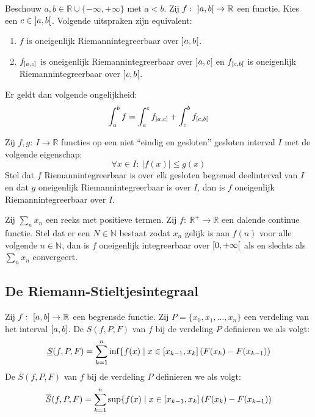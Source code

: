 \documentclass[main.tex]{subfiles}
\begin{document}
\begin{bpr}
  Beschouw $a,b\in \mathbb{R} \cup \{-\infty,+\infty\}$ met $a<b$.
  Zij $f:\ \interval[open]{a}{b} \rightarrow \mathbb{R}$ een functie.
  Kies een $c\in \interval[open]{a}{b}$.
  Volgende uitspraken zijn equivalent:
  \begin{enumerate}
  \item $f$ is oneigenlijk Riemannintegreerbaar over $\interval[open]{a}{b}$.
  \item $f_{\interval[open left]{a}{c}}$ is oneigenlijk Riemannintegreerbaar over $\interval[open]{a}{c}$ en $f_{\interval[open right]{c}{b}}$ is oneigenlijk Riemannintegreerbaar over $\interval[open]{c}{b}$.
  \end{enumerate}
  Er geldt dan volgende ongelijkheid:
  \[ \int_{a}^{b}f = \int_{a}^{c}f_{\interval[open left]{a}{c}} + \int_{c}^{b}f_{\interval[open right]{c}{b}} \]
\end{bpr}

\begin{bst}
  Zij $f,g:\ I \rightarrow \mathbb{R}$ functies op een niet ``eindig en gesloten'' gesloten interval $I$ met de volgende eigenschap:
  \[ \forall x\in I:\ |f(x)| \le g(x) \]
  Stel dat $f$ Riemannintegreerbaar is over elk gesloten begrensd deelinterval van $I$ en dat $g$ oneigenlijk Riemannintegreerbaar is over $I$, dan is $f$ oneigenlijk Riemannintegreerbaar over $I$.
\end{bst}

\begin{bst}
  Zij $\sum_{n}x_{n}$ een reeks met positieve termen.
  Zij $f:\ \mathbb{R}^{+}\rightarrow \mathbb{R}$ een dalende continue functie.
  Stel dat er een $N\in \mathbb{N}$ bestaat zodat $x_{n}$ gelijk is aan $f(n)$ voor alle volgende $n\in \mathbb{N}$, dan is $f$ oneigenlijk integreerbaar over $\interval[open right]{0}{+\infty}$ als en slechts als $\sum_{n}x_{n}$ convergeert.
\end{bst}

\subsection{De Riemann-Stieltjesintegraal}
\label{sec:de-riem-stieltj}

\begin{de}
  Zij $f:\ \interval{a}{b} \rightarrow \mathbb{R}$ een begrensde functie.
  Zij $P = \{x_{0},x_{1},\dotsc,x_{n}\}$ een verdeling van het interval $\interval{a}{b}$.
  De  $\underline{S}(f,P,F)$ van $f$ bij de verdeling $P$ definieren we als volgt:
\[ \underline{S}(f,P,F) = \sum_{k=1}^{n} \inf\{ f(x) \mid x\in \interval{x_{k-1}}{x_{k}} \left( F(x_{k}) - F(x_{k-1}) \right) \]
  De  $\overline{S}(f,P,F)$ van $f$ bij de verdeling $P$ definieren we als volgt:
\[ \overline{S}(f,P,F) = \sum_{k=1}^{n} \sup\{ f(x) \mid x\in \interval{x_{k-1}}{x_{k}} \left( F(x_{k}) - F(x_{k-1}) \right) \]
\end{de}
\end{document}
